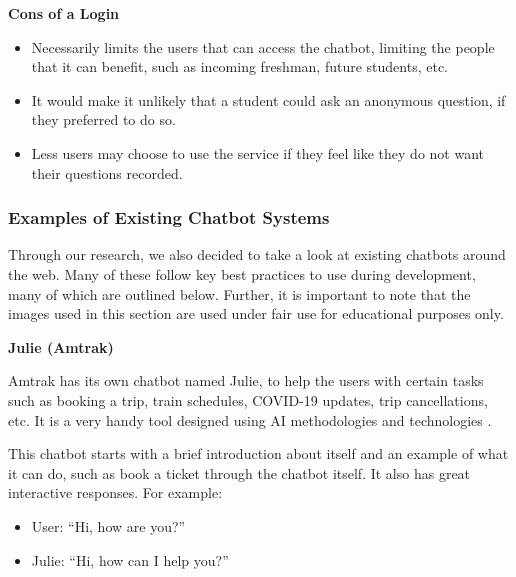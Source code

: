 \documentclass[titlepage, 12pt]{article}
\begin{document}
\textbf{Cons of a Login}

\begin{itemize}
    \item Necessarily limits the users that can access the chatbot, limiting the people that it can benefit, such as incoming freshman, future students, etc.
    \item It would make it unlikely that a student could ask an anonymous question, if they preferred to do so.
    \item Less users may choose to use the service if they feel like they do not want their questions recorded.
\end{itemize}


\subsubsection{Examples of Existing Chatbot Systems}

Through our research, we also decided to take a look at existing chatbots around the web. Many of these follow key best practices to use during development, many of which are outlined below. Further, it is important to note that the images used in this section are used under fair use for educational purposes only.

\textbf{Julie (Amtrak)}

Amtrak has its own chatbot named Julie, to help the users with certain tasks such as booking a trip, train schedules, COVID-19 updates, trip cancellations, etc. It is a very handy tool designed using AI methodologies and technologies \cite{bib-1-14}.


This chatbot starts with a brief introduction about itself and an example of what it can do, such as book a ticket through the chatbot itself. It also has great interactive responses. For example:

\begin{itemize}
    \item User: “Hi, how are you?”
    \item Julie: “Hi, how can I help you?”
\end{itemize}
\end{document}

